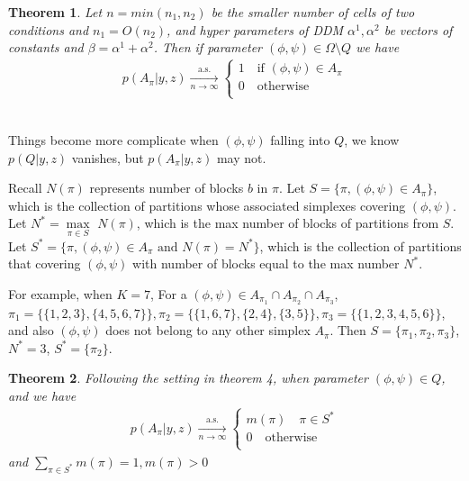 \documentclass[aoas,preprint]{imsart}
\newtheorem{theorem}{Theorem}
\begin{document}
\begin{theorem} Let $n = min(n_1, n_2)$ be the smaller number of cells of two conditions and $n_1 = O(n_2)$, and hyper parameters of DDM $\alpha^1, \alpha^2$ be vectors of constants and $\beta = \alpha^1 + \alpha^2$. Then if parameter $(\phi, \psi)\in \Omega\setminus Q $ we have 
\begin{eqnarray*}
    p(A_{\pi} | y, z) \xrightarrow[n\rightarrow\infty]{\text{a.s.}}\left\{
                \begin{array}{ll}
                 1 \quad \text{if }(\phi,\psi) \in A_\pi\\
                 0 \quad \text{otherwise}\\             
                \end{array}
              \right.
\end{eqnarray*}
\end{theorem}
\hfill\\
Things become more complicate when $(\phi, \psi)$ falling into $Q$, we know $p(Q | y, z)$ vanishes, but $p(A_\pi | y,z)$ may not. 

Recall $N(\pi)$ represents number of blocks $b$ in $\pi$. Let $S = \{\pi,  (\phi, \psi) \in A_\pi\}$, which is the collection of partitions whose associated simplexes covering $(\phi,\psi)$. Let $N^* = \underset{\pi\in S}\max$ $N(\pi)$, which is the max number of blocks of partitions from $S$. Let $S^* = \{\pi,  (\phi, \psi) \in A_\pi \text{ and } N(\pi) = N^*\}$, which is the collection of partitions that covering $(\phi, \psi)$ with number of blocks equal to the max number $N^*$. 

For example, when $K = 7$, For a $(\phi, \psi)\in A_{\pi_1} \cap A_{\pi_2} \cap A_{\pi_3}$, $\pi_1 = \{\{1,2,3\}, \{4,5,6,7\}\}, \pi_2 = \{\{1,6,7\}, \{2,4\},\{3,5\}\}, \pi_3 = \{\{1,2,3,4,5,6\}\}$, and also $(\phi, \psi)$ does not belong to any other simplex $A_\pi$. Then $S = \{\pi_1, \pi_2, \pi_3\}$, $N^* = 3$, $S^* = \{\pi_2\}.$ 

\begin{theorem} Following the setting in theorem 4, when parameter $(\phi, \psi)\in Q$,  and we have 
\begin{eqnarray*}
    p(A_{\pi} | y, z) \xrightarrow[n\rightarrow\infty]{\text{a.s.}}\left\{
                \begin{array}{ll}
                 m(\pi) \quad  \pi \in S^* \\
                 0 \quad \text{otherwise}\\             
                \end{array}
              \right.
\end{eqnarray*}
and $\underset{\pi\in S^*}\sum m(\pi) = 1, m(\pi) > 0$\\
\end{theorem}
\end{document}
